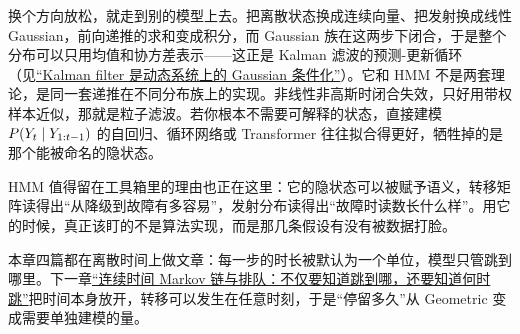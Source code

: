 换个方向放松，就走到别的模型上去。把离散状态换成连续向量、把发射换成线性 Gaussian，前向递推的求和变成积分，而 Gaussian 族在这两步下闭合，于是整个分布可以只用均值和协方差表示——这正是 Kalman 滤波的预测-更新循环（见\hyperref[sec:13-Machine-Learning/07-Graphical-and-Sequential-Models/03]{``Kalman filter 是动态系统上的 Gaussian 条件化''}）。它和 HMM 不是两套理论，是同一套递推在不同分布族上的实现。非线性非高斯时闭合失效，只好用带权样本近似，那就是粒子滤波。若你根本不需要可解释的状态，直接建模 \(P(Y_t\mid Y_{1:t-1})\) 的自回归、循环网络或 Transformer 往往拟合得更好，牺牲掉的是那个能被命名的隐状态。

HMM 值得留在工具箱里的理由也正在这里：它的隐状态可以被赋予语义，转移矩阵读得出``从降级到故障有多容易''，发射分布读得出``故障时读数长什么样''。用它的时候，真正该盯的不是算法实现，而是那几条假设有没有被数据打脸。

本章四篇都在离散时间上做文章：每一步的时长被默认为一个单位，模型只管跳到哪里。下一章\hyperref[ch:050]{``连续时间 Markov 链与排队：不仅要知道跳到哪，还要知道何时跳''}把时间本身放开，转移可以发生在任意时刻，于是``停留多久''从 Geometric 变成需要单独建模的量。
